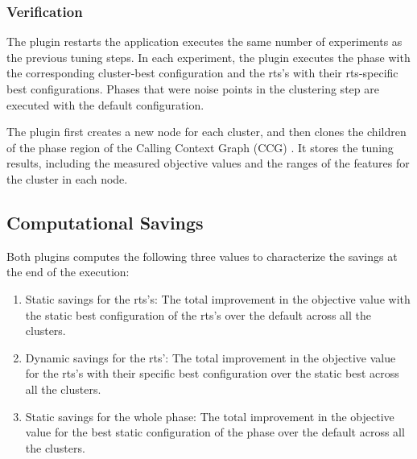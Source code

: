 \subsubsection{Verification} \label{verification} 
The plugin restarts the application executes the same number of experiments as the previous tuning steps. In each experiment, the plugin executes the phase with the
corresponding cluster-best configuration and the rts's with their rts-specific
best configurations. Phases that were noise points in the clustering step are executed with the default configuration.

The plugin first creates a new node for each cluster, and then clones the children of the phase region of the Calling Context Graph (CCG) . It stores the tuning results, including the measured objective values and the ranges of the features for the cluster in each node. 

\subsection{Computational Savings} \label{sec:com-savings}
Both plugins computes the following three values to characterize the savings at the end of the execution:
\begin{enumerate}
	\item Static savings for the rts's: The total improvement in the objective value with the static best configuration of the rts’s over the default across all the clusters.
	\item Dynamic savings for the rts’: The total improvement in the objective value for the rts’s with their specific best configuration over the static best across all the clusters.
	\item Static savings for the whole phase: The total improvement in the objective value for the best static configuration of the phase over the default across all the clusters.
\end{enumerate}


